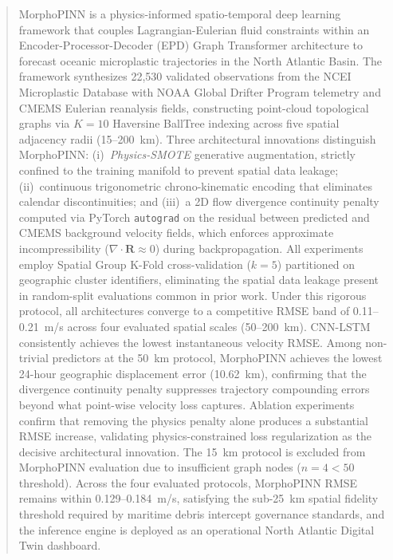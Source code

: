 \documentclass[conference]{IEEEtran}
\begin{document}
\begin{abstract}
MorphoPINN is a physics-informed spatio-temporal deep learning framework that couples Lagrangian-Eulerian fluid constraints within an Encoder-Processor-Decoder (EPD) Graph Transformer architecture to forecast oceanic microplastic trajectories in the North Atlantic Basin. The framework synthesizes 22,530 validated observations from the NCEI Microplastic Database with NOAA Global Drifter Program telemetry and CMEMS Eulerian reanalysis fields, constructing point-cloud topological graphs via $K=10$ Haversine BallTree indexing across five spatial adjacency radii (15--200~km). Three architectural innovations distinguish MorphoPINN: (i)~\textit{Physics-SMOTE} generative augmentation, strictly confined to the training manifold to prevent spatial data leakage; (ii)~continuous trigonometric chrono-kinematic encoding that eliminates calendar discontinuities; and (iii)~a 2D flow divergence continuity penalty computed via PyTorch \texttt{autograd} on the residual between predicted and CMEMS background velocity fields, which enforces approximate incompressibility ($\nabla \cdot \mathbf{R} \approx 0$) during backpropagation. All experiments employ Spatial Group K-Fold cross-validation ($k=5$) partitioned on geographic cluster identifiers, eliminating the spatial data leakage present in random-split evaluations common in prior work. Under this rigorous protocol, all architectures converge to a competitive RMSE band of 0.11--0.21~m/s across four evaluated spatial scales (50--200~km). CNN-LSTM consistently achieves the lowest instantaneous velocity RMSE. Among non-trivial predictors at the 50~km protocol, MorphoPINN achieves the lowest 24-hour geographic displacement error (10.62~km), confirming that the divergence continuity penalty suppresses trajectory compounding errors beyond what point-wise velocity loss captures. Ablation experiments confirm that removing the physics penalty alone produces a substantial RMSE increase, validating physics-constrained loss regularization as the decisive architectural innovation. The 15~km protocol is excluded from MorphoPINN evaluation due to insufficient graph nodes ($n=4 < 50$ threshold). Across the four evaluated protocols, MorphoPINN RMSE remains within 0.129--0.184~m/s, satisfying the sub-25~km spatial fidelity threshold required by maritime debris intercept governance standards, and the inference engine is deployed as an operational North Atlantic Digital Twin dashboard.
\end{abstract}
\end{document}

